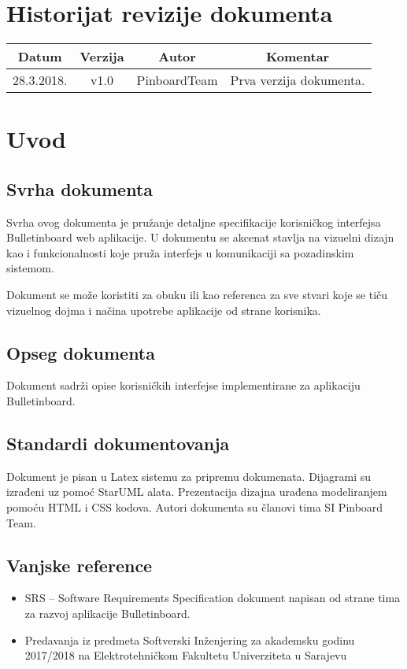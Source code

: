 \section*{Historijat revizije dokumenta}


\begin{center}
\begin{tabular}{ |c |c |c |c|} \hline
 Datum & Verzija & Autor & Komentar\\ \hline
 28.3.2018. & v1.0 & PinboardTeam  & Prva verzija dokumenta. \\  \hline
\end{tabular}
\end{center}
\newpage


\section{Uvod}

\subsection{Svrha dokumenta}
Svrha ovog dokumenta je pružanje detaljne specifikacije korisničkog interfejsa Bulletinboard web aplikacije. U dokumentu se akcenat stavlja na vizuelni dizajn kao i funkcionalnosti koje pruža interfejs u komunikaciji sa pozadinskim sistemom.


Dokument se može koristiti za obuku ili kao referenca za sve stvari koje se tiču vizuelnog dojma i načina upotrebe aplikacije od strane korisnika.
\subsection{Opseg dokumenta}

Dokument sadrži opise korisničkih interfejse implementirane za aplikaciju Bulletinboard.
\subsection{Standardi dokumentovanja}

Dokument je pisan u Latex sistemu za pripremu dokumenata.
Dijagrami su izrađeni uz pomoć StarUML alata.
Prezentacija dizajna urađena modeliranjem pomoću HTML i CSS kodova.
Autori dokumenta su članovi tima SI Pinboard Team.

\subsection{Vanjske reference}
\begin{itemize}
\item SRS – Software Requirements Specification dokument napisan od strane tima za razvoj aplikacije Bulletinboard.
\item Predavanja iz predmeta Softverski Inženjering za akademsku godinu 2017/2018 na Elektrotehničkom Fakultetu Univerziteta u Sarajevu
\end{itemize}